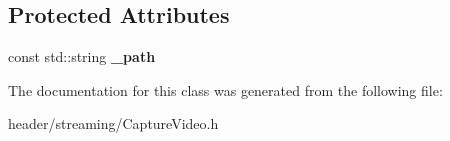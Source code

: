 \subsection*{Protected Attributes}
\begin{DoxyCompactItemize}
\item 
\mbox{\label{class_capture_video_aa4af6fcb50ba52f08a545b7355719775}} 
const std\+::string {\bfseries \+\_\+path}
\end{DoxyCompactItemize}


The documentation for this class was generated from the following file\+:\begin{DoxyCompactItemize}
\item 
header/streaming/Capture\+Video.\+h\end{DoxyCompactItemize}
